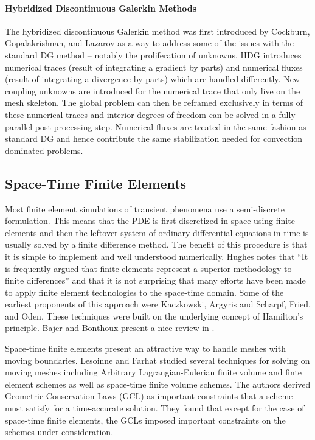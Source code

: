 \documentclass[Proposal.tex]{subfiles}
\begin{document}
\paragraph*{Hybridized Discontinuous Galerkin Methods}
The hybridized discontinuous Galerkin method was first introduced by Cockburn, Gopalakrishnan, and Lazarov\cite{HDG}
as a way to address some of the issues with the standard DG method 
-- notably the proliferation of unknowns.
HDG introduces numerical traces (result of integrating a gradient by parts) and numerical fluxes (result of integrating a divergence by parts) 
which are handled differently. 
New coupling unknowns are introduced for the numerical trace that only live on the mesh skeleton.
The global problem can then be reframed exclusively in terms of these numerical traces and interior degrees of freedom
can be solved in a fully parallel post-processing step.
Numerical fluxes are treated in the same fashion as standard DG and hence contribute the same stabilization needed for convection dominated problems.

\subsection{Space-Time Finite Elements}
Most finite element simulations of transient phenomena use a semi-discrete formulation.
This means that the PDE is first discretized in space using finite elements and then the leftover system of ordinary differential equations in time
is usually solved by a finite difference method.
The benefit of this procedure is that it is simple to implement and well understood numerically.
Hughes\cite{HughesSpaceTimeElastoDynamics} notes that 
``It is frequently argued that finite elements represent a superior methodology to finite differences'' 
and that it is not surprising that many efforts have been made to apply finite element technologies to the space-time domain.
Some of the earliest proponents of this approach were Kaczkowski\cite{Kaczkowski1975}, 
Argyris and Scharpf\cite{ArgyrisSpaceTime}, Fried\cite{FriedSpaceTime}, and Oden\cite{OdenSpaceTime}.
These techniques were built on the underlying concept of Hamilton's principle.
Bajer and Bonthoux present a nice review in \cite{Bonthoux1991}.

Space-time finite elements present an attractive way to handle meshes with moving boundaries.
Lesoinne and Farhat\cite{GCL} studied several techniques for solving on moving meshes including Arbitrary Lagrangian-Eulerian
finite volume and finte element schemes as well as space-time finite volume schemes. 
The authors derived Geometric Conservation Laws (GCL) as important constraints that a scheme must satisfy for a time-accurate solution.
They found that except for the case of space-time finite elements, the GCLs imposed important constraints on the schemes under consideration.
\end{document}
